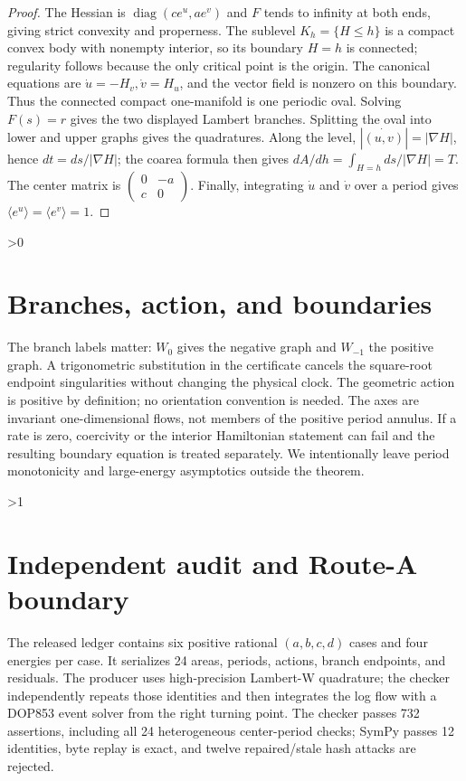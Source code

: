 \documentclass[11pt]{article}
\begin{document}
\begin{proof}
The Hessian is $\operatorname{diag}(ce^u,ae^v)$ and $F$ tends to infinity at
both ends, giving strict convexity and properness.  The sublevel
$K_h=\{H\le h\}$ is a compact convex body with nonempty interior, so its
boundary $H=h$ is connected; regularity follows because the only critical
point is the origin.  The canonical equations are
$\dot u=-H_v,\dot v=H_u$, and the vector field is nonzero on this boundary.
Thus the connected compact one-manifold is one periodic oval.  Solving
$F(s)=r$ gives the two displayed Lambert branches.  Splitting the oval into
lower and upper graphs gives the quadratures.  Along the level,
$|\dot{(u,v)}|=|\nabla H|$, hence $dt=ds/|\nabla H|$; the coarea formula
then gives $dA/dh=\int_{H=h}ds/|\nabla H|=T$.  The center matrix is
$\left(\begin{smallmatrix}0&-a\\c&0\end{smallmatrix}\right)$.
Finally, integrating $\dot u$ and $\dot v$ over a period gives
$\langle e^u\rangle=\langle e^v\rangle=1$.
\end{proof}

\ifnum\CRevisionRound>0
\section{Branches, action, and boundaries}
The branch labels matter: $W_0$ gives the negative graph and $W_{-1}$ the
positive graph.  A trigonometric substitution in the certificate cancels the
square-root endpoint singularities without changing the physical clock.  The
geometric action is positive by definition; no orientation convention is
needed.  The axes are invariant one-dimensional flows, not members of the
positive period annulus.  If a rate is zero, coercivity or the interior
Hamiltonian statement can fail and the resulting boundary equation is treated
separately.  We intentionally leave period monotonicity and large-energy
asymptotics outside the theorem.
\fi

\ifnum\CRevisionRound>1
\section{Independent audit and Route-A boundary}
The released ledger contains six positive rational $(a,b,c,d)$ cases and four
energies per case.  It serializes 24 areas, periods, actions, branch endpoints,
and residuals.  The producer uses high-precision Lambert-W quadrature; the
checker independently repeats those identities and then integrates the log
flow with a DOP853 event solver from the right turning point.  The checker
passes 732 assertions, including all 24 heterogeneous center-period checks;
SymPy passes 12 identities, byte replay is exact, and twelve repaired/stale
hash attacks are rejected.
\end{document}
